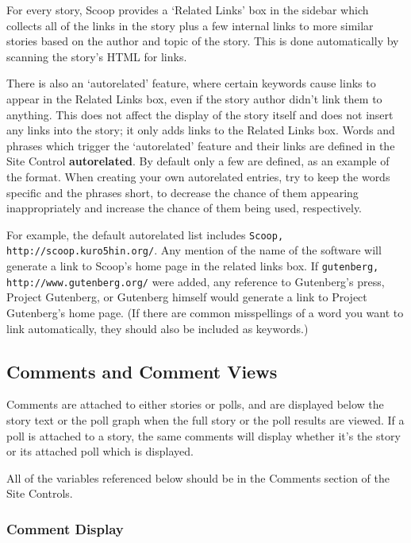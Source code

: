 For every story, Scoop provides a `Related Links' box in the sidebar which collects all of the links in the story plus a few internal links to more similar stories based on the author and topic of the story. This is done automatically by scanning the story's HTML for links.

There is also an `autorelated' feature, where certain keywords cause links to appear in the Related Links box, even if the story author didn't link them to anything. This does not affect the display of the story itself and does not insert any links into the story; it only adds links to the Related Links box. Words and phrases which trigger the `autorelated' feature and their links are defined in the Site Control {\bf autorelated}. By default only a few are defined, as an example of the format. When creating your own autorelated entries, try to keep the words specific and the phrases short, to decrease the chance of them appearing inappropriately and increase the chance of them being used, respectively.

For example, the default autorelated list includes \verb!Scoop, http://scoop.kuro5hin.org/!. Any mention of the name of the software will generate a link to Scoop's home page in the related links box. If \verb!gutenberg, http://www.gutenberg.org/! were added, any reference to Gutenberg's press, Project Gutenberg, or Gutenberg himself would generate a link to Project Gutenberg's home page. (If there are common misspellings of a word you want to link automatically, they should also be included as keywords.)

\subsection{Comments and Comment Views}
\label{features-comment-views}

Comments are attached to either stories or polls, and are displayed below the story text or the poll graph when the full story or the poll results are viewed.  If a poll is attached to a story, the same comments will display whether it's the story or its attached poll which is displayed.

All of the variables referenced below should be in the Comments section of the Site Controls.

\subsubsection{Comment Display}
\label{comments-display}

